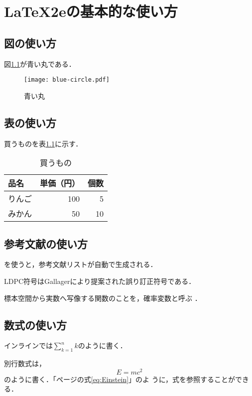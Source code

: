 \chapter{\LaTeX2e{}の基本的な使い方}

\section{図の使い方}

図\ref{fig:青い丸}が青い丸である．

\begin{figure}[htbp]
 \centering
 \texttt{[image: blue-circle.pdf]}
 \caption{青い丸}
 \label{fig:青い丸}
\end{figure}

\section{表の使い方}

買うものを表\ref{table:買うもの}に示す．

\begin{table}[htbp]
 \caption{買うもの}
 \label{table:買うもの}
 \centering
 \begin{tabular}{lrr}
  \hline
  品名   & 単価（円） & 個数 \\
  \hline
  りんご & 100        & 5    \\
  みかん & 50         & 10   \\
  \hline
 \end{tabular}
\end{table}

\section{参考文献の使い方}

\BibTeX{}を使うと，参考文献リストが自動で生成される．

LDPC符号はGallagerにより提案された誤り訂正符号である\cite{gallager}．

標本空間から実数へ写像する関数のことを，確率変数と呼ぶ
\cite[p.20~Definition~2.1]{mitzenmacher}．

\section{数式の使い方}

インラインでは$\sum_{k = 1}^n k$のように書く．

別行数式は，
\begin{equation}
 E = mc^2 \label{eq:Einstein}
\end{equation}
のように書く．「\pageref{eq:Einstein}ページの式\eqref{eq:Einstein}」のよ
うに，式を参照することができる．

